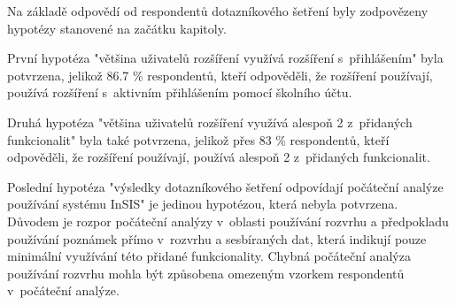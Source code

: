 Na základě odpovědí od respondentů dotazníkového šetření byly zodpovězeny hypotézy stanovené na začátku kapitoly.

První hypotéza "většina uživatelů rozšíření využívá rozšíření s~přihlášením" byla potvrzena, jelikož 86.7 \% respondentů, kteří odpověděli, že rozšíření používají, používá rozšíření s~aktivním přihlášením pomocí školního účtu.

Druhá hypotéza "většina uživatelů rozšíření využívá alespoň 2 z~přidaných funkcionalit" byla také potvrzena, jelikož přes 83 \% respondentů, kteří odpověděli, že rozšíření používají, používá alespoň 2 z~přidaných funkcionalit.

Poslední hypotéza "výsledky dotazníkového šetření odpovídají počáteční analýze používání systému InSIS" je jedinou hypotézou, která nebyla potvrzena. Důvodem je rozpor počáteční analýzy v~oblasti používání rozvrhu a předpokladu používání poznámek přímo v~rozvrhu a sesbíraných dat, která indikují pouze minimální využívání této přidané funkcionality. Chybná počáteční analýza používání rozvrhu mohla být způsobena omezeným vzorkem respondentů v~počáteční analýze.
